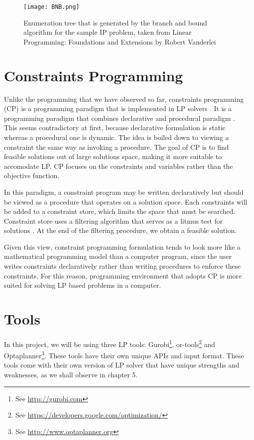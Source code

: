 \begin{figure}[!ht]
  \centering
    \texttt{[image: BNB.png]}
    \caption{Enumeration tree that is generated by the branch and bound algorithm for the sample IP problem, taken from
     Linear Programming: Foundations and Extensions by Robert Vanderlei \cite{LPVanderbei}}
\end{figure}

\section{Constraints Programming}
Unlike the programming that we have observed so far, constraints programming (CP) is a programming paradigm that is implemented
in LP solvers \cite{wiki:cp}. It is a programming paradigm that combines declarative and procedural paradigm \cite{wiki:cp, Bockmayr2003}.
This seems contradictory at first, because declarative formulation is static whereas a procedural one is dynamic. The idea is boiled down to viewing
a constraint the same way as invoking a procedure. The goal of CP is to find feasible solutions out of large solutions space, making it
more suitable to accomodate LP. CP focuses on the constraints and variables rather than the objective function.

In this paradigm, a constraint program may be written declaratively but should be viewed as a procedure that operates on a
solution space. Each constraints will be added to a constraint store, which limits the space that must be searched.
Constraint store uses a filtering algorithm that serves as a litmus test for solutions \cite{Bockmayr2003}.
At the end of the filtering procedure, we obtain a feasible solution.

Given this view, constraint programming formulation tends to look
more like a mathematical programming model than a computer program, since the user writes constraints declaratively
rather than writing procedures to enforce these constraints. For this reason, programming environment that adopts CP
is more suited for solving LP based problems in a computer.

\section{Tools}
In this project, we will be using three LP tools: Gurobi\footnote{See \url{http://gurobi.com}},
or-tools\footnote{See \url{https://developers.google.com/optimization/}} and Optaplanner\footnote{See \url{http://www.optaplanner.org}}.
These tools have their own unique APIs and input format. These tools come with their own version of LP solver that
have unique strengths and weaknesses, as we shall observe in chapter 5.

